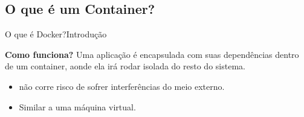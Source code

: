 \documentclass[10pt]{beamer}
\begin{document}
\subsection{O que é um Container?}
\begin{frame}{O que é Docker?}{Introdução}
    \begin{block}{\textbf{Como funciona?}}
        Uma aplicação é encapsulada com suas dependências dentro de um container, aonde ela irá rodar isolada do resto do sistema. 
        \begin{itemize}
            \item<2-> não corre risco de sofrer interferências do meio externo.
            \item<3-> Similar a uma máquina virtual.
        \end{itemize}
    \end{block}
\end{frame}
\end{document}
